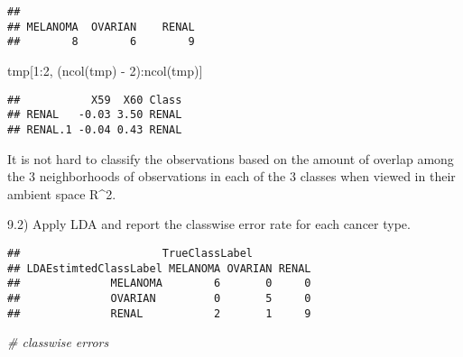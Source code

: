 \documentclass[
  11pt,
]{article}
\newenvironment{Shaded}{\begin{snugshade}}{\end{snugshade}}
\newcommand{\AttributeTok}[1]{\textcolor[rgb]{0.77,0.63,0.00}{#1}}
\newcommand{\CommentTok}[1]{\textcolor[rgb]{0.56,0.35,0.01}{\textit{#1}}}
\newcommand{\DecValTok}[1]{\textcolor[rgb]{0.00,0.00,0.81}{#1}}
\newcommand{\FunctionTok}[1]{\textcolor[rgb]{0.00,0.00,0.00}{#1}}
\newcommand{\NormalTok}[1]{#1}
\newcommand{\OtherTok}[1]{\textcolor[rgb]{0.56,0.35,0.01}{#1}}
\newcommand{\SpecialCharTok}[1]{\textcolor[rgb]{0.00,0.00,0.00}{#1}}
\begin{document}
\begin{verbatim}
## 
## MELANOMA  OVARIAN    RENAL 
##        8        6        9
\end{verbatim}

\begin{Shaded}
\begin{Highlighting}[]
\NormalTok{tmp[}\DecValTok{1}\SpecialCharTok{:}\DecValTok{2}\NormalTok{, (}\FunctionTok{ncol}\NormalTok{(tmp) }\SpecialCharTok{{-}} \DecValTok{2}\NormalTok{)}\SpecialCharTok{:}\FunctionTok{ncol}\NormalTok{(tmp)]}
\end{Highlighting}
\end{Shaded}

\begin{verbatim}
##           X59  X60 Class
## RENAL   -0.03 3.50 RENAL
## RENAL.1 -0.04 0.43 RENAL
\end{verbatim}

It is not hard to classify the observations based on the amount of
overlap among the 3 neighborhoods of observations in each of the 3
classes when viewed in their ambient space R\^{}2.

9.2) Apply LDA and report the classwise error rate for each cancer type.

\begin{Shaded}
\end{Shaded}

\begin{verbatim}
##                      TrueClassLabel
## LDAEstimtedClassLabel MELANOMA OVARIAN RENAL
##              MELANOMA        6       0     0
##              OVARIAN         0       5     0
##              RENAL           2       1     9
\end{verbatim}

\begin{Shaded}
\begin{Highlighting}[]
\CommentTok{\# classwise errors}
\end{Highlighting}
\end{Shaded}
\end{document}
